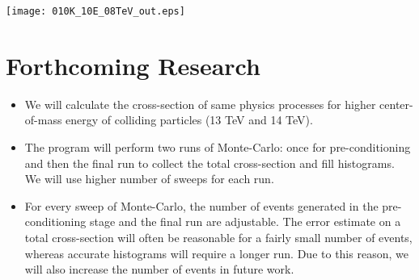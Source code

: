 \documentclass[a0,portrait]{a0poster}
\begin{document}
\begin{multicols}{2}
\begin{footnotesize}
\begin{center}
\begin{tabular}{|c|c|c|c|c|c|c||c|}
\hline
\end{tabular}

\end{center}
\end{footnotesize}



\begin{center}\vspace{0.5cm}
\texttt{[image: 010K\_10E\_08TeV\_out.eps]}
\end{center}



\section*{\color{Crimson} Forthcoming Research}

\begin{itemize}
\item We will calculate the cross-section of same physics processes for higher center-of-mass energy of colliding particles (13 TeV and 14 TeV).
\item The program will perform two runs of Monte-Carlo: once for pre-conditioning and then the final run to collect the total cross-section and fill histograms. We will use higher number of sweeps for each run.
\item For every sweep of Monte-Carlo, the number of events generated in the pre-conditioning stage and the final run are adjustable. The error estimate on a total cross-section will often be reasonable for a fairly small number of events, whereas accurate histograms will require a longer run. Due to this reason, we will also increase the number of events in future work.
\end{itemize}




\end{multicols}
\end{document}
